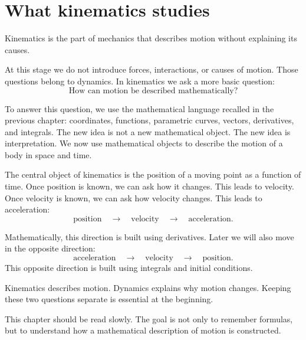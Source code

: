 \section{What kinematics studies}

\begin{definitionbox}
Kinematics is the part of mechanics that describes motion without explaining its causes.
\end{definitionbox}

At this stage we do not introduce forces, interactions, or causes of motion. Those questions belong to dynamics. In kinematics we ask a more basic question:
\[
\text{How can motion be described mathematically?}
\]

To answer this question, we use the mathematical language recalled in the previous chapter: coordinates, functions, parametric curves, vectors, derivatives, and integrals. The new idea is not a new mathematical object. The new idea is interpretation. We now use mathematical objects to describe the motion of a body in space and time.

The central object of kinematics is the position of a moving point as a function of time. Once position is known, we can ask how it changes. This leads to velocity. Once velocity is known, we can ask how velocity changes. This leads to acceleration:
\[
\text{position} \quad \longrightarrow \quad \text{velocity} \quad \longrightarrow \quad \text{acceleration}.
\]

Mathematically, this direction is built using derivatives. Later we will also move in the opposite direction:
\[
\text{acceleration} \quad \longrightarrow \quad \text{velocity} \quad \longrightarrow \quad \text{position}.
\]
This opposite direction is built using integrals and initial conditions.

\begin{remarkbox}
Kinematics describes motion. Dynamics explains why motion changes. Keeping these two questions separate is essential at the beginning.
\end{remarkbox}

This chapter should be read slowly. The goal is not only to remember formulas, but to understand how a mathematical description of motion is constructed.
